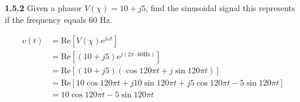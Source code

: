 \documentclass{article}
\begin{document}
\textbf{1.5.2} Given a phasor $V(\chi) = 10 + j5$, find the sinusoidal signal this represents if the frequency equals 60
Hz.

\begin{equation*}
	\begin{split}
		v(t) & = \text{Re}\left[V(\chi)e^{j\omega t}\right] \\
		& = \text{Re}\left[(10 + j5)e^{j(2\pi \cdot 60 \text{Hz})}\right] \\
		& = \text{Re}\left[(10 + j5)(\cos{120\pi t} + j\sin{120\pi t})\right] \\
		& = \text{Re}\left[10\cos{120\pi t} + j10\sin{120\pi t} + j5\cos{120\pi t} - 5\sin{120\pi t}\right] \\
		& = 10\cos{120\pi t} - 5\sin{120\pi t}
	\end{split}
\end{equation*}
\end{document}
